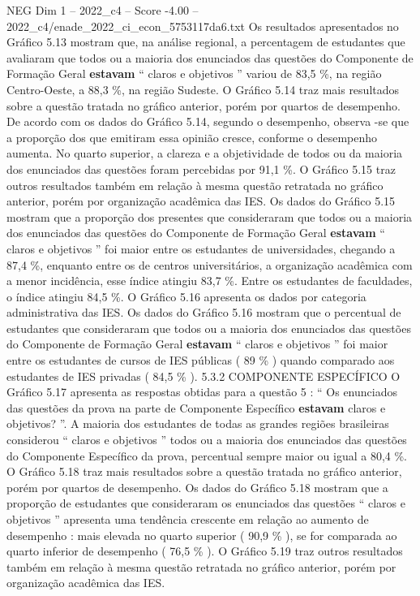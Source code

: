 \begin{textsample}{NEG Dim 1 – 2022\_c4 – Score -4.00 – 2022\_c4/enade\_2022\_ci\_econ\_5753117da6.txt}
Os resultados apresentados no Gráfico 5.13 mostram que, na análise regional, a percentagem de estudantes que avaliaram que todos ou a maioria dos enunciados das questões do Componente de Formação Geral \textbf{estavam} “ claros e objetivos ” variou de 83,5 \%, na região Centro-Oeste, a 88,3 \%, na região Sudeste.
O Gráfico 5.14 traz mais resultados sobre a questão tratada no gráfico anterior, porém por quartos de desempenho.
De acordo com os dados do Gráfico 5.14, segundo o desempenho, observa -se que a proporção dos que emitiram essa opinião cresce, conforme o desempenho aumenta.
No quarto superior, a clareza e a objetividade de todos ou da maioria dos enunciados das questões foram percebidas por 91,1 \%.
O Gráfico 5.15 traz outros resultados também em relação à mesma questão retratada no gráfico anterior, porém por organização acadêmica das IES.
Os dados do Gráfico 5.15 mostram que a proporção dos presentes que consideraram que todos ou a maioria dos enunciados das questões do Componente de Formação Geral \textbf{estavam} “ claros e objetivos ” foi maior entre os estudantes de universidades, chegando a 87,4 \%, enquanto entre os de centros universitários, a organização acadêmica com a menor incidência, esse índice atingiu 83,7 \%.
Entre os estudantes de faculdades, o índice atingiu 84,5 \%.
O Gráfico 5.16 apresenta os dados por categoria administrativa das IES.
Os dados do Gráfico 5.16 mostram que o percentual de estudantes que consideraram que todos ou a maioria dos enunciados das questões do Componente de Formação Geral \textbf{estavam} “ claros e objetivos ” foi maior entre os estudantes de cursos de IES públicas ( 89 \% ) quando comparado aos estudantes de IES privadas ( 84,5 \% ). 5.3.2 COMPONENTE ESPECÍFICO O Gráfico 5.17 apresenta as respostas obtidas para a questão 5 : “ Os enunciados das questões da prova na parte de Componente Específico \textbf{estavam} claros e objetivos? ”.
A maioria dos estudantes de todas as grandes regiões brasileiras considerou “ claros e objetivos ” todos ou a maioria dos enunciados das questões do Componente Específico da prova, percentual sempre maior ou igual a 80,4 \%.
O Gráfico 5.18 traz mais resultados sobre a questão tratada no gráfico anterior, porém por quartos de desempenho.
Os dados do Gráfico 5.18 mostram que a proporção de estudantes que consideraram os enunciados das questões “ claros e objetivos ” apresenta uma tendência crescente em relação ao aumento de desempenho : mais elevada no quarto superior ( 90,9 \% ), se for comparada ao quarto inferior de desempenho ( 76,5 \% ).
O Gráfico 5.19 traz outros resultados também em relação à mesma questão retratada no gráfico anterior, porém por organização acadêmica das IES.

\end{textsample}
